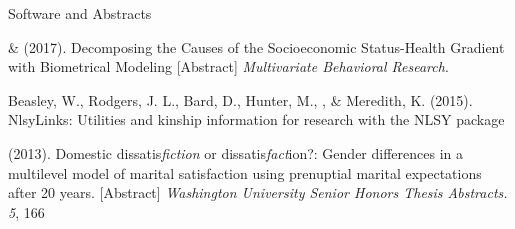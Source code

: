 \begin{rSection}{\textrm{Software and Abstracts}}%
\begin{etaremune}
\item\meb \& \joe (2017). Decomposing the Causes of the Socioeconomic Status-Health Gradient with Biometrical Modeling [Abstract] \textit{Multivariate Behavioral Research}.
\item  Beasley, W., Rodgers, J. L., Bard, D., Hunter, M., \meb, \& Meredith, K. (2015). NlsyLinks: Utilities and kinship information for research with the NLSY \R package \href{https://cran.r-project.org/web/packages/NlsyLinks}{\color{blue}{https://cran.r-project.org/web/packages/NlsyLinks}}
\item\meb (2013). Domestic dissatis{\em fiction} or dissatis{\em fact}ion?: Gender differences in a multilevel model of marital satisfaction using prenuptial marital expectations after 20 years. [Abstract] {\em Washington University Senior Honors Thesis Abstracts. 5}, 166
\end{etaremune}
\end{rSection}